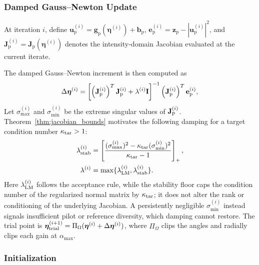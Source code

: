 \documentclass[journal]{IEEEtran}
\begin{document}
\subsubsection{Damped Gauss--Newton Update}

At iteration $i$, define $\mathbf{u}_{\mathrm{p}}^{(i)} = \mathbf{g}_{\mathrm{p}} \left(
\boldsymbol{\eta}^{(i)} \right) +
\mathbf{b}_{\mathrm{p}}$, $\mathbf{e}_{\mathrm{p}}^{(i)} =
\mathbf{z}_{\mathrm{p}} - \left| \mathbf{u}_{\mathrm{p}}^{(i)}
\right|^{2}$, and \(\mathbf{J}_{\mathrm{p}}^{(i)}
=\mathbf{J}_{\mathrm{p}}(\boldsymbol{\eta}^{(i)})\) denotes the
intensity-domain Jacobian evaluated at the current iterate.

The damped Gauss--Newton increment is then computed as
\begin{equation}
\Delta\boldsymbol{\eta}^{(i)}
=
\left[
\left(\mathbf{J}_{\rm p}^{(i)}\right)^T
\mathbf{J}_{\rm p}^{(i)}
+
\lambda^{(i)}\mathbf{I}
\right]^{-1}
\left(\mathbf{J}_{\rm p}^{(i)}\right)^T
\mathbf{e}_{\rm p}^{(i)},
\label{eq:parametric_gn_increment}
\end{equation}
Let $\sigma_{\max}^{(i)}$ and $\sigma_{\min}^{(i)}$ be the extreme singular
values of $\mathbf J_{\rm p}^{(i)}$.  Theorem~\ref{thm:jacobian_bounds}
motivates the following damping for a target condition number
$\kappa_{\rm tar}>1$:
\begin{equation}
\begin{aligned}
\lambda_{\rm stab}^{(i)}&=
\left[
\frac{(\sigma_{\max}^{(i)})^2-
\kappa_{\rm tar}(\sigma_{\min}^{(i)})^2}
{\kappa_{\rm tar}-1}
\right]_{+},\\
\lambda^{(i)}&=\max\{\lambda_{\rm LM}^{(i)},\lambda_{\rm stab}^{(i)}\}.
\end{aligned}
\label{eq:stability_aware_gn_damping}
\end{equation}
Here $\lambda_{\rm LM}^{(i)}$ follows the acceptance rule, while the stability
floor caps the condition number of the regularized normal matrix by
$\kappa_{\rm tar}$; it does not alter the rank or conditioning of the underlying
Jacobian. A persistently negligible $\sigma_{\min}^{(i)}$ instead signals
insufficient pilot or reference diversity, which damping cannot restore. The
trial point is
$\boldsymbol\eta_{\rm trial}^{(i+1)}=\Pi_\Omega(
\boldsymbol\eta^{(i)}+\Delta\boldsymbol\eta^{(i)})$, where $\Pi_\Omega$ clips
the angles and radially clips each gain at $\alpha_{\max}$.
\subsubsection{Initialization}
\end{document}
